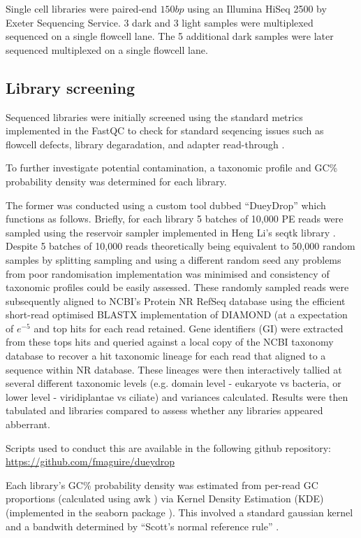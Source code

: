 Single cell libraries were paired-end \(150bp\) using an Illumina HiSeq 2500 by Exeter
Sequencing Service. 3 dark and 3 light samples were multiplexed sequenced on a single 
flowcell lane.  The 5 additional dark samples were later sequenced multiplexed on a single
flowcell lane.

\subsection{Library screening}

Sequenced libraries were initially screened using the standard
metrics implemented in the FastQC to check for standard seqencing issues
such as flowcell defects, library degaradation, and adapter read-through \citep{fastqc}.

To further investigate potential contamination, a taxonomic
profile and GC\% probability density was determined for each library.

The former was conducted using a custom tool dubbed ``DueyDrop'' which functions as follows.
Briefly, for each library 5 batches of 10,000 PE reads were sampled 
using the reservoir sampler \citep{Vitter1985} implemented in Heng Li's seqtk library \citep{SeqtkGitHub}.
Despite 5 batches of 10,000 reads theoretically being equivalent to 50,000 random samples by splitting
sampling and using a different random seed any problems from poor randomisation implementation 
was minimised and consistency of taxonomic profiles could be easily assessed.
These randomly sampled reads were subsequently aligned to NCBI's Protein NR RefSeq database \citep{Pruitt2007}
using the efficient short-read optimised BLASTX implementation of DIAMOND \citep{Buchfink2015} (at a expectation
    of \(e^{-5}\) and top hits for each read retained.  Gene identifiers (GI) were extracted from these tops hits and queried against a
local copy of the NCBI taxonomy database \citep{Federhen2012} to recover a hit taxonomic lineage for each
read that aligned to a sequence within NR database. These lineages were then interactively tallied 
at several different taxonomic levels (e.g. domain level - eukaryote vs bacteria, or lower level - viridiplantae vs ciliate) and variances
calculated.  Results were then tabulated and libraries compared to assess whether any libraries appeared
abberrant.

Scripts used to conduct this are available in the following github repository:
\url{https://github.com/fmaguire/dueydrop}

Each library's GC\% probability density was estimated from per-read GC proportions
(calculated using awk \citep{Aho1987}) via Kernel Density Estimation (KDE) \citep{Rosenblatt1956,Parzen1962} 
(implemented in the seaborn package \citep{michael_waskom_2015_19108}).
This involved a standard gaussian kernel and a bandwith determined by ``Scott's normal reference rule'' \citep{Scott1979}.  



